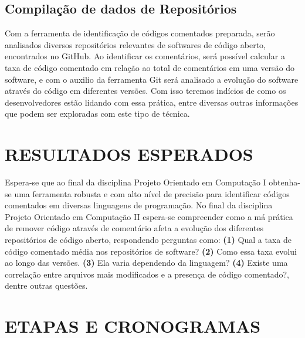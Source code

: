 \documentclass{abnt}
\begin{document}
\section{Compilação de dados de Repositórios}

Com a ferramenta de identificação de códigos comentados preparada, serão analisados 
diversos repositórios relevantes de softwares de código aberto, encontrados
no GitHub. Ao identificar os comentários, será possível calcular a taxa de 
código comentado em relação ao total de comentários em uma versão do 
software, e com o auxilio da ferramenta Git será analisado a evolução do 
software através do código em diferentes versões. Com isso teremos 
indícios de como os desenvolvedores estão lidando com essa prática, entre 
diversas outras informações que podem ser exploradas com este tipo
de técnica.

\chapter{RESULTADOS ESPERADOS}

Espera-se que ao final da disciplina Projeto Orientado em Computação I  
obtenha-se uma ferramenta robusta e com alto nível de precisão para identificar 
códigos comentados em diversas linguagens de programação. No final da 
disciplina Projeto Orientado em Computação II espera-se compreender como a 
má prática de remover código através de comentário afeta a evolução dos 
diferentes repositórios de código aberto, respondendo perguntas como:
\textbf{(1)} Qual a taxa de código comentado média nos repositórios de software?
\textbf{(2)} Como essa taxa evolui ao longo das versões.
\textbf{(3)} Ela varia dependendo da linguagem?
\textbf{(4)} Existe uma correlação entre arquivos mais modificados e a presença de 
    código comentado?,
dentre outras questões.



\chapter{ETAPAS E CRONOGRAMAS}
\end{document}
